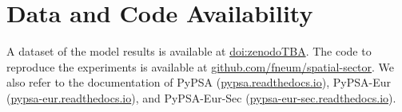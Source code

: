\documentclass[12pt,preprint]{elsarticle}
\begin{document}
\section*{Data and Code Availability}

A dataset of the model results is available at \href{zenodoTBA}{doi:zenodoTBA}.
The code to reproduce the experiments is available at \href{https://github.com/fneum/spatial-sector}{github.com/fneum/spatial-sector}.
We also refer to the documentation of PyPSA (\href{https://pypsa.readthedocs.io}{pypsa.readthedocs.io}),
PyPSA-Eur (\href{https://pypsa-eur.readthedocs.io}{pypsa-eur.readthedocs.io}), and
PyPSA-Eur-Sec (\href{https://pypsa-eur-sec.readthedocs.io}{pypsa-eur-sec.readthedocs.io}).

\renewcommand{\ttdefault}{\sfdefault}
%



\newpage

\makeatletter
\renewcommand \thesection{S\@arabic\c@section}
\renewcommand\thetable{S\@arabic\c@table}
\renewcommand \thefigure{S\@arabic\c@figure}
\makeatother

\renewcommand{\citenumfont}[1]{S#1}

\setcounter{equation}{0}
\setcounter{figure}{0}
\setcounter{table}{0}
\setcounter{section}{0}



\renewcommand{\ttdefault}{\sfdefault}

\begin{small}
	\tableofcontents
\end{small}
~\\
\end{document}
